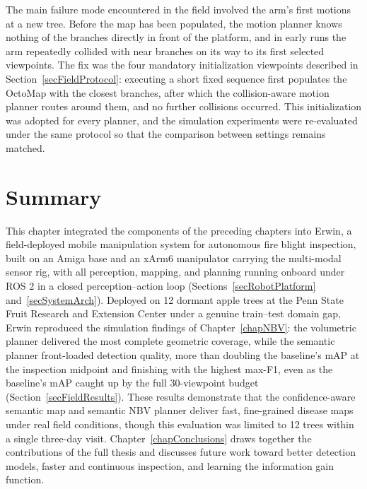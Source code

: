 The main failure mode encountered in the field involved the arm's first
motions at a new tree. Before the map has been populated, the motion
planner knows nothing of the branches directly in front of the platform,
and in early runs the arm repeatedly collided with near branches on its
way to its first selected viewpoints. The fix was the four mandatory
initialization viewpoints described in Section~\ref{secFieldProtocol}:
executing a short fixed sequence first populates the OctoMap with the
closest branches, after which the collision-aware motion planner routes
around them, and no further collisions occurred. This initialization was
adopted for every planner, and the simulation experiments were
re-evaluated under the same protocol so that the comparison between
settings remains matched.


\section{Summary} \label{secErwinSummary}

This chapter integrated the components of the preceding chapters into Erwin,
a field-deployed mobile manipulation system for autonomous fire blight
inspection, built on an Amiga base and an xArm6 manipulator carrying the
multi-modal sensor rig, with all perception, mapping, and planning running
onboard under ROS 2 in a closed perception--action loop
(Sections~\ref{secRobotPlatform} and~\ref{secSystemArch}). Deployed on 12
dormant apple trees at the Penn State Fruit Research and Extension Center
under a genuine train--test domain gap, Erwin reproduced the simulation
findings of Chapter~\ref{chapNBV}: the volumetric planner delivered the
most complete geometric coverage, while the semantic planner front-loaded
detection quality, more than doubling the baseline's mAP at the
inspection midpoint and finishing with the highest max-F1, even as the
baseline's mAP caught up by the full 30-viewpoint budget
(Section~\ref{secFieldResults}). These results demonstrate that the
confidence-aware semantic map and semantic NBV planner deliver fast,
fine-grained disease maps under real field conditions, though this
evaluation was limited to 12 trees within a single three-day visit.
Chapter~\ref{chapConclusions} draws together the contributions of the
full thesis and discusses future work toward better detection models,
faster and continuous inspection, and learning the information gain
function.
